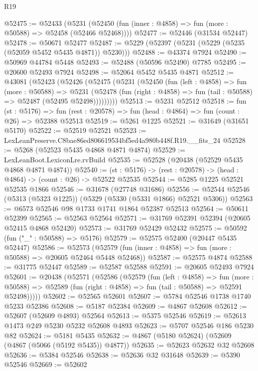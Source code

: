 \begin{lexlean}{R19}
\begin{coremodule}
@52475 := @52433
    (@5231 (@52450 (fun (inner : @4858) => fun (more : @50588) => @52458 (@52466 @52468))))
@52477 := @52446 (@31534 @52447)
@52478 := @50671 @52477
@52487 := @5229 (@52397 (@5231 (@5229 (@5235 (@52059 @5452 @5435 @4871)) @5230)))
@52488 := @43374 @7924
@52490 := @50969 @44784 @5448
@52493 := @52488 (@50596 @52490) @7785
@52495 := @20600 @52493 @7924
@52498 := @52064 @5452 @5435 @4871
@52512 := @43081
    (@52423
      (@52426
        (@52475
          (@5231
            (@52450
              (fun (left : @4858) =>
              fun (more : @50588) =>
              @5231
                (@52478
                  (fun (right : @4858) => fun (tail : @50588) => @52487 (@52495 @52498)))))))))
@52513 := @5231 @52512
@52518 := fun (st : @5176) =>
  fun (rest : @20578) => fun (head : @4864) => fun (count : @26) => @52388 @52513
@52519 := @5261 @1225
@52521 := @31649 (@31651 @5170)
@52522 := @52519 @52521
@52523 := LexLeanPreserve.C8bae86ed806619534bf5ed4a980b448f.R19.__fits_24
@52528 := @5268 (@52523 @5435 @4868 @4871 @4874)
@52529 := LexLeanBoot.LexiconLre.rvBuild
@52535 := @52528 (@20438 (@52529 @5435 @4868 @4871 @4874))
@52540 := (st : @5176) -> (rest : @20578) -> (head : @4864) -> (count : @26) -> @52522 @52535
@52544 := @5285 @1225 @52521 @52535 @1866
@52546 := @31678 (@27748 @31686)
@52556 := @52544 @52546 (@5313 (@5323 @1225)) (@5329 (@5330 (@5331 @1866) @52521 @5306))
@52563 := @6573 @52546 @98 @1733 @1741 @1864 @52387 @52513
@52564 := @50611 @52399
@52565 := @52563 @52564
@52571 := @31769 @52391 @52394 (@20605 @52415 @4868 @52420)
@52573 := @31769 @52429 @52432
@52575 := @50592 (fun ("_" : @50588) => @5176)
@52579 := @52575 @52400 (@20447 @5435 @52447)
@52586 := @52573 (@52579 (fun (inner : @4858) => fun (more : @50588) => @20605 @52464 @5448 @52468))
@52587 := @52575 @4874
@52588 := @31775 @52447
@52589 := @52587 @52588
@52591 := @20605 @52493 @7924
@52601 := @20438
    (@52571
      (@52586
        (@52579
          (fun (left : @4858) =>
          fun (more : @50588) =>
          @52589 (fun (right : @4858) => fun (tail : @50588) => @52591 @52498)))))
@52602 := @52565 @52601
@52607 := @5784 @52546 @1738 @1740 @5233 @52386
@52608 := @5187 @52384
@52609 := @4867 @52608
@52612 := @52607 (@52609 @4893) @52564
@52613 := @5375 @52546
@52619 := @52613 @1473 @249 @5230 @5232 @52608 @4893
@52623 := @5707 @52546 @186 @5230 @82
@52624 := @5181 @5435
@52632 := @4867 (@5180 @52624) (@52609 (@4867 (@5066 (@5192 @5435)) @4877))
@52635 := @52623 @52632 @32 @52608
@52636 := @5384 @52546
@52638 := @52636 @32 @31648
@52639 := @5390 @52546
@52669 := @52602

\end{coremodule}
\end{lexlean}
